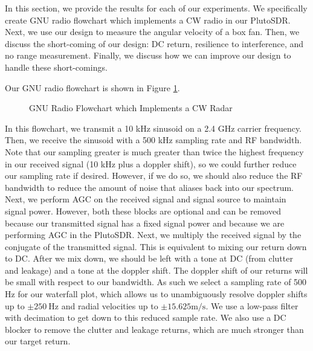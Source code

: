 \documentclass{article}
\begin{document}
In this section, we provide the results for each of our experiments. We specifically create GNU radio flowchart which implements a CW radio in our PlutoSDR. Next, we use our design to measure the angular velocity of a box fan. Then, we discuss the short-coming of our design: DC return, resilience to interference, and no range measurement. Finally, we discuss how we can improve our design to handle these short-comings.

Our GNU radio flowchart is shown in Figure \ref{fig::gnu_radio_block_diagram}. 

\begin{figure}[H]
    	\centering
    	\caption{GNU Radio Flowchart which Implements a CW Radar}
    	\label{fig::gnu_radio_block_diagram}
\end{figure}

\noindent In this flowchart, we transmit a 10 kHz sinusoid on a 2.4 GHz carrier frequency. Then, we receive the sinusoid with a 500 kHz sampling rate and RF bandwidth. Note that our sampling greater is much greater than twice the highest frequency in our received signal (10 kHz plus a doppler shift), so we could further reduce our sampling rate if desired. However, if we do so, we should also reduce the RF bandwidth to reduce the amount of noise that aliases back into our spectrum. Next, we perform AGC on the received signal and signal source to maintain signal power. However, both these blocks are optional and can be removed because our transmitted signal has a fixed signal power and because we are performing AGC in the PlutoSDR. Next, we multiply the received signal by the conjugate of the transmitted signal. This is equivalent to mixing our return down to DC. After we mix down, we should be left with a tone at DC (from clutter and leakage) and a tone at the doppler shift. The doppler shift of our returns will be small with respect to our bandwidth. As such we select a sampling rate of 500 Hz for our waterfall plot, which allows us to unambiguously resolve doppler shifts up to $\pm 250\ \text{Hz}$ and radial velocities up to $\pm 15.625 \text{m}/\text{s}$. We use a low-pass filter with decimation to get down to this reduced sample rate. We also use a DC blocker to remove the clutter and leakage returns, which are much stronger than our target return.
\end{document}
